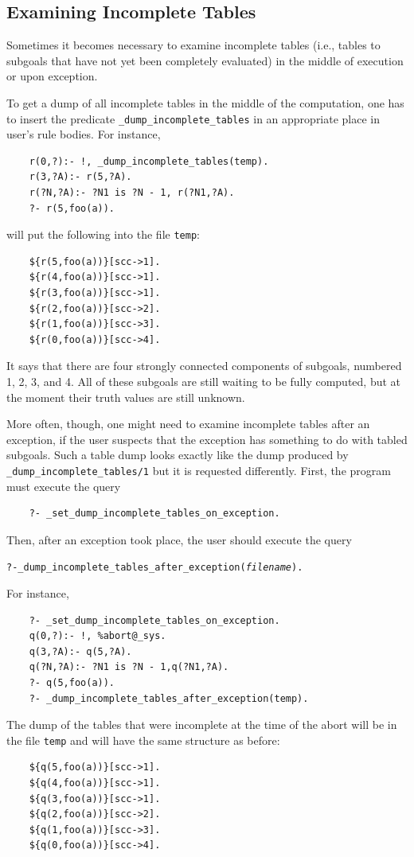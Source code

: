 \documentclass[11pt]{article}
\begin{document}
\subsection{Examining Incomplete Tables}

Sometimes it becomes necessary to examine incomplete tables (i.e., tables
to subgoals that have not yet been completely evaluated)
in the middle of execution or upon exception.

To get a dump of all incomplete tables in the middle of the computation,
one has to insert the predicate \texttt{\_dump\_incomplete\_tables} in an
appropriate place in user's rule bodies. For instance,

\begin{verbatim}
    r(0,?):- !, _dump_incomplete_tables(temp).
    r(3,?A):- r(5,?A).
    r(?N,?A):- ?N1 is ?N - 1, r(?N1,?A).
    ?- r(5,foo(a)).
\end{verbatim}
will put the following into the file \texttt{temp}:
\begin{verbatim}
    ${r(5,foo(a))}[scc->1].
    ${r(4,foo(a))}[scc->1].
    ${r(3,foo(a))}[scc->1].
    ${r(2,foo(a))}[scc->2].
    ${r(1,foo(a))}[scc->3].
    ${r(0,foo(a))}[scc->4].
\end{verbatim}
It says that there are four strongly connected components of subgoals,
numbered 1, 2, 3, and 4. All of these subgoals are still waiting to be
fully computed, but at the moment their truth values are still unknown.

More often, though, one might need to examine incomplete tables after an
exception, if the user suspects that the exception has something to do with
tabled subgoals. Such a table dump looks exactly like the dump produced by
\texttt{\_dump\_incomplete\_tables/1} but it is requested differently.
First, the program must execute the query
\begin{verbatim}
    ?- _set_dump_incomplete_tables_on_exception.
\end{verbatim}
Then, after an exception took place, the user should execute the query
\begin{alltt}
    ?- _dump_incomplete_tables_after_exception(\emph{filename}).
\end{alltt}
For instance,
\begin{verbatim}
    ?- _set_dump_incomplete_tables_on_exception.
    q(0,?):- !, %abort@_sys.
    q(3,?A):- q(5,?A).
    q(?N,?A):- ?N1 is ?N - 1,q(?N1,?A).
    ?- q(5,foo(a)).
    ?- _dump_incomplete_tables_after_exception(temp).
\end{verbatim}
The dump of the tables that were incomplete at the time of the abort 
will be in the file \texttt{temp} and will have the same structure as before:
\begin{verbatim}
    ${q(5,foo(a))}[scc->1].
    ${q(4,foo(a))}[scc->1].
    ${q(3,foo(a))}[scc->1].
    ${q(2,foo(a))}[scc->2].
    ${q(1,foo(a))}[scc->3].
    ${q(0,foo(a))}[scc->4].
\end{verbatim}
\end{document}
